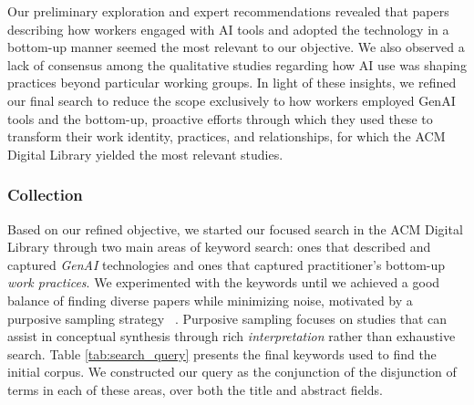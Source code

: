 Our preliminary exploration and expert recommendations revealed that papers describing how workers engaged with AI tools and adopted the technology in a bottom-up manner seemed the most relevant to our objective. We also observed a lack of consensus among the qualitative studies regarding how AI use was shaping practices beyond particular working groups. In light of these insights, we refined our final search to reduce the scope exclusively to how workers employed GenAI tools and the bottom-up, proactive efforts through which they used these to transform their work identity, practices, and relationships, for which the ACM Digital Library yielded the most relevant studies.


\subsubsection{Collection}
Based on our refined objective, we started our focused search in the ACM Digital Library through two main areas of keyword search: ones that described and captured \textit{GenAI} technologies and ones that captured practitioner's bottom-up \textit{work practices}. We experimented with the keywords until we achieved a good balance of finding diverse papers while minimizing noise, motivated by a purposive sampling strategy ~\cite{Xiao_Watson_2019}. Purposive sampling focuses on studies that can assist in conceptual synthesis through rich \textit{interpretation} rather than exhaustive search. Table \ref{tab:search_query} presents the final keywords used to find the initial corpus. We constructed our query as the conjunction of the disjunction of terms in each of these areas, over both the title and abstract fields. %

